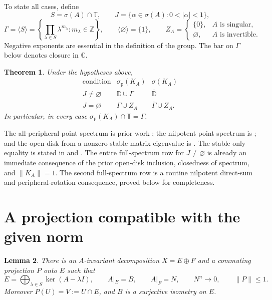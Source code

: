 \documentclass[11pt]{article}
\newtheorem{theorem}{Theorem}
\newtheorem{lemma}[theorem]{Lemma}
\newcommand{\C}{\mathbb C}
\newcommand{\T}{\mathbb T}
\newcommand{\D}{\mathbb D}
\newcommand{\spoint}{\sigma_{\mathrm p}}
\begin{document}
To state all cases, define
\[
 S=\sigma(A)\cap\T,\qquad
 J=\{\alpha\in\sigma(A):0<|\alpha|<1\},
\]
\[
 \Gamma=\langle S\rangle
   =\left\{\prod_{\lambda\in S}\lambda^{m_\lambda}:
                      m_\lambda\in\mathbb Z\right\},
 \qquad \langle\varnothing\rangle=\{1\},
 \qquad
 Z_A=
 \begin{cases}
   \{0\},&A\text{ is singular},\\
   \varnothing,&A\text{ is invertible}.
 \end{cases}
\]
Negative exponents are essential in the definition of the group.
The bar on \(\Gamma\) below denotes closure in \(\C\).

\begin{theorem}\label{thm:classification}
Under the hypotheses above,
\[
\begin{array}{c|c|c}
\text{condition}&\spoint(K_A)&\sigma(K_A)\\ \hline
J\neq\varnothing&\D\cup\Gamma&\overline{\D}\\[2pt]
J=\varnothing&\Gamma\cup Z_A&\overline{\Gamma}\cup Z_A .
\end{array}
\]
In particular, in every case
\(\spoint(K_A)\cap\T=\Gamma\).
\end{theorem}

The all-peripheral point spectrum is prior work
\cite[Theorem~3.1.5, printed p.~38]{Kuester2015};
the nilpotent point spectrum is
\cite[Proposition~3.1.7, printed p.~39]{Kuester2015};
and the open disk from a nonzero stable matrix eigenvalue is
\cite[Theorem~3.1.13, printed pp.~41--42]{Kuester2015}.
The stable-only equality is stated in
\cite[Theorem~3.1.14(ii), printed p.~43]{Kuester2015} and
\cite[Theorem~5(iii), printed p.~321]{Kuester2016}.
The entire full-spectrum row for \(J\neq\varnothing\) is already an
immediate consequence of the prior open-disk inclusion, closedness of
spectrum, and \(\|K_A\|=1\).
The second full-spectrum row is a routine nilpotent direct-sum and
peripheral-rotation consequence, proved below for completeness.

\section{A projection compatible with the given norm}

\begin{lemma}\label{lem:projection}
There is an \(A\)-invariant decomposition \(X=E\oplus F\) and a commuting
projection \(P\) onto \(E\) such that
\[
 E=\bigoplus_{\lambda\in S}\ker(A-\lambda I),\qquad
 A|_E=B,\qquad A|_F=N,\qquad
 N^n\longrightarrow0,\qquad \|P\|\leq1.
\]
Moreover \(P(U)=V:=U\cap E\), and \(B\) is a surjective isometry on \(E\).
\end{lemma}
\end{document}
